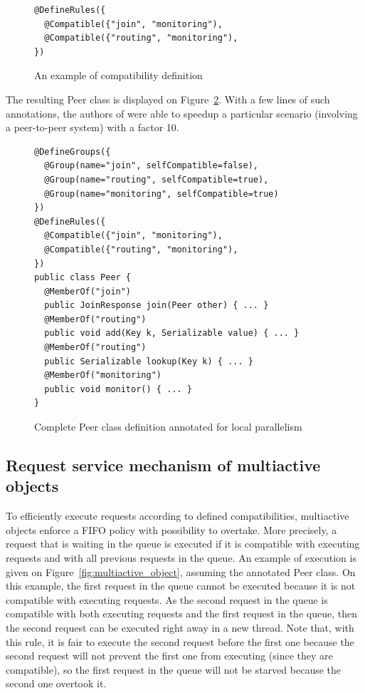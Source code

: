 \documentclass[11pt]{report}
\begin{document}
\begin{figure}[!ht]
	\lstset{language=java, numbers=left, numberstyle=\tiny, stepnumber=1, numbersep=5pt, basicstyle=\footnotesize}
	\begin{lstlisting}[frame=single]
@DefineRules({
  @Compatible({"join", "monitoring"),
  @Compatible({"routing", "monitoring"),
})
 	\end{lstlisting}
\caption{An example of compatibility definition}
\label{fig:compatible_annotation}
\end{figure}

The resulting Peer class is displayed on Figure~\ref{fig:annotated_peer_class}. With a few lines of such annotations, the authors of \cite{ref:mao} were able to speedup a particular scenario (involving a peer-to-peer system) with a factor 10.

\begin{figure}[!ht]
	\lstset{language=java, numbers=left, numberstyle=\tiny, stepnumber=1, numbersep=5pt, basicstyle=\footnotesize}
	\begin{lstlisting}[frame=single]
@DefineGroups({
  @Group(name="join", selfCompatible=false),
  @Group(name="routing", selfCompatible=true),
  @Group(name="monitoring", selfCompatible=true)
})
@DefineRules({
  @Compatible({"join", "monitoring"),
  @Compatible({"routing", "monitoring"),
})
public class Peer {
  @MemberOf("join")
  public JoinResponse join(Peer other) { ... }
  @MemberOf("routing")
  public void add(Key k, Serializable value) { ... }
  @MemberOf("routing")
  public Serializable lookup(Key k) { ... }
  @MemberOf("monitoring")
  public void monitor() { ... }
}
 	\end{lstlisting}
\caption{Complete Peer class definition annotated for local parallelism}
\label{fig:annotated_peer_class}
\end{figure}

\subsection{Request service mechanism of multiactive objects}\label{sec:MAOservice}
To efficiently execute requests according to defined compatibilities, multiactive objects enforce a FIFO policy with possibility to overtake. More precisely, a request that is waiting in the queue is executed if it is compatible with executing requests and with all previous requests in the queue. An example of execution is given on Figure~\ref{fig:multiactive_object}, assuming the annotated Peer class. On this example, the first request in the queue cannot be executed because it is not compatible with executing requests. As the second request in the queue is compatible with both executing requests and the first request in the queue, then the second request can be executed right away in a new thread. Note that, with this rule, it is fair to execute the second request before the first one because the second request will not prevent the first one from executing (since they are compatible), so the first request in the queue will not be starved because the second one overtook it.
\end{document}
